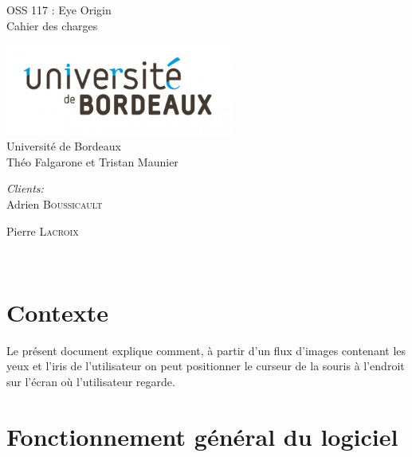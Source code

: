 \documentclass[a4paper, 12pt]{report}
\begin{document}
	\begin{titlepage}
    	\begin{center}
		\vfill
		\Huge{OSS 117 : Eye Origin\\
        Cahier des charges}
		\vfill
		\end{center}
		\begin{center}
	        \centering\includegraphics[height=3cm]{univ.jpg}\hfill \\
	    
		\LARGE{Université de Bordeaux}\\
		 Théo Falgarone et Tristan Maunier \\
		\vfill
		\vfill
         \end{center}
                 \begin{minipage}{0.4\textwidth}
\begin{center} \large
\emph{Clients:} \\
Adrien \textsc{Boussicault} %
\par Pierre \textsc{Lacroix} %
\end{center}
\end{minipage}\\[2cm]
	\end{titlepage}
	
    \tableofcontents
    
    \setcounter{page}{0} 
    	
	\chapter*{Contexte} %
		Le présent document explique comment, à partir d'un flux d'images contenant les yeux et l'iris de l'utilisateur on peut positionner le curseur de la souris à l'endroit sur l'écran où l'utilisateur regarde.
	\chapter{Fonctionnement général du logiciel}
\end{document}
